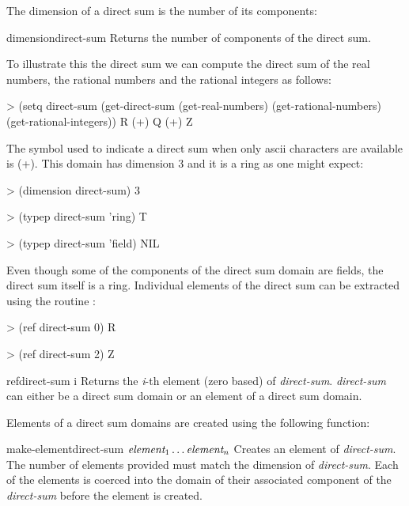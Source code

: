 The dimension of a direct sum is the number of its components:

\begin{functiondef}{dimension}{direct-sum}
Returns the number of components of the direct sum.
\end{functiondef}

To illustrate this the direct sum we can compute the direct sum of the
real numbers, the rational numbers and the rational integers as
follows:
\begin{code}
> (setq direct-sum (get-direct-sum (get-real-numbers)
                                   (get-rational-numbers)
                                   (get-rational-integers))
R (+) Q (+) Z
\end{code}

The symbol used to indicate a direct sum when only
{\sc ascii} characters are available is (+).  This domain has
dimension 3 and it is a ring as one might expect:
\begin{code}  
> (dimension direct-sum)
3
  
> (typep direct-sum 'ring)
T
  
> (typep direct-sum 'field)
NIL
\end{code}
  
Even though some of the components of the direct sum domain are
fields, the direct sum itself is a ring.  Individual elements of the
direct sum can be extracted using the routine :
\begin{code}  
> (ref direct-sum 0)
R
  
> (ref direct-sum 2)
Z
\end{code}

\begin{functiondef}{ref}{direct-sum i}
Returns the {\em i}-th element (zero based) of {\em direct-sum}.  {\em
direct-sum} can either be a direct sum domain or an element of a
direct sum domain.
\end{functiondef}
  
Elements of a direct sum domains are created using
the following function:

\begin{functiondef}{make-element}{direct-sum $\mbox{\em element}_1
\ldots \mbox{\em element}_n$}
 Creates an element of {\em direct-sum\/}.  The number of elements
provided must match the dimension of {\em direct-sum\/}.  Each of the
elements is coerced into the domain of their associated component of
the {\em direct-sum} before the element is created.
\end{functiondef}

